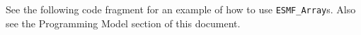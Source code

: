 

See the following code fragment for an example of
how to use {\tt ESMF\_Array}s.  Also see
the Programming Model section of this document.




